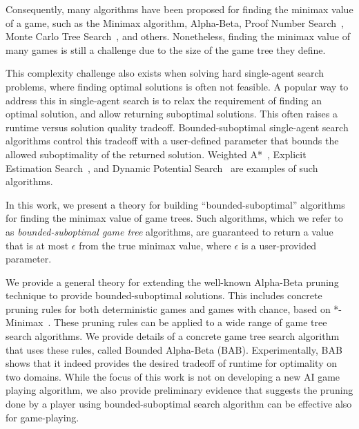 \documentclass[runningheads]{llncs}
\begin{document}
Consequently, many algorithms have been proposed for finding the minimax value of a game, such as the Minimax algorithm, Alpha-Beta, Proof Number Search~\citep{allis1994proof}, Monte Carlo Tree Search~\citep{coulom2006efficient,kocsis2006bandit,lanctot2013monte}, and others. 
Nonetheless, finding the minimax value of many games is still a challenge due to the size of the game tree they define. 

This complexity challenge also exists when solving hard single-agent search problems, where finding optimal solutions is often not feasible. A popular way to address this in single-agent search is to relax the requirement of finding an optimal solution, and allow returning suboptimal solutions. This often raises a runtime versus solution quality tradeoff. Bounded-suboptimal single-agent search algorithms control this tradeoff with a user-defined parameter that bounds the allowed suboptimality of the returned solution. Weighted A*~\citep{pohl1970heuristic}, Explicit Estimation Search~\citep{thayer2011bounded}, and Dynamic Potential Search~\citep{gilon2016dynamic} are examples of such algorithms. 

In this work, we present a theory for building ``bounded-suboptimal'' algorithms for finding the minimax value of game trees. Such algorithms, which we refer to as \emph{bounded-suboptimal game tree} algorithms, are guaranteed to return a value that is at most $\epsilon$ from the true minimax value, where $\epsilon$ is a user-provided parameter. 


We provide a general theory for extending the well-known Alpha-Beta pruning technique to provide bounded-suboptimal solutions. This includes concrete pruning rules for both deterministic games and games with chance, based on *-Minimax~\citep{ballard1983minimax,hauk2004rediscovering}. These pruning rules can be applied to a wide range of game tree search algorithms. We provide details of a concrete game tree search algorithm that uses these rules, called Bounded Alpha-Beta (BAB). Experimentally, BAB shows that it indeed provides the desired tradeoff of runtime for optimality on two domains. 
While the focus of this work is not on developing a new AI game playing algorithm, we also provide preliminary evidence that suggests the pruning done by a player using bounded-suboptimal search algorithm can be effective also for game-playing. 

\end{document}
